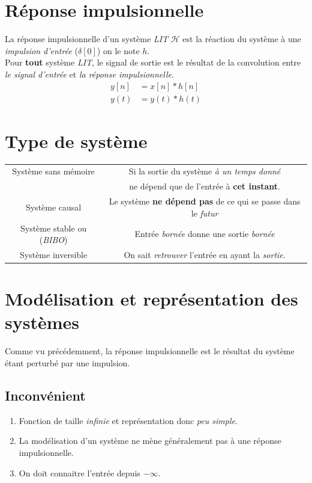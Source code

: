 \documentclass{report}
\begin{document}
\section{Réponse impulsionnelle}
La réponse impulsionnelle d'un système \textit{LIT} $\mathcal{H}$ est la réaction du système à une \textit{impulsion d'entrée} ($\delta[0]$) on le note $h$.\\

Pour \textbf{tout} système \textit{LIT}, le signal de sortie est le résultat de la convolution entre \textit{le signal d'entrée} et \textit{la réponse impulsionnelle}.
\begin{align}
y[n] &= x[n] \ast h[n]\\
y(t) &= y(t) \ast h(t)
\end{align}

\section{Type de système}
\begin{center}
\begin{tabular}{|c|c|}
	\hline
	Système sans mémoire & Si la sortie du système \textit{à un temps donné}\\
	&  ne dépend que de l'entrée à \textbf{cet instant}.\\
	\hline
	Système causal & Le système \textbf{ne dépend pas} de ce qui se passe dans le \textit{futur}\\
	\hline
	Système stable ou (\textit{BIBO}) & Entrée \textit{bornée} donne une sortie \textit{bornée}\\
	\hline
	Système inversible & On sait \textit{retrouver} l'entrée en ayant la \textit{sortie}.\\
	\hline

\end{tabular}
\end{center}

\section{Modélisation et représentation des systèmes}
Comme vu précédemment, la réponse impulsionnelle est le résultat du système étant perturbé par une impulsion. 
\subsection{Inconvénient}
\begin{enumerate}
\item Fonction de taille \textit{infinie} et représentation donc \textit{peu simple}.
\item La modélisation d'un système ne mène généralement pas à une réponse impulsionnelle.
\item On doit connaitre l'entrée depuis $-\infty$.
\end{enumerate}
\end{document}
